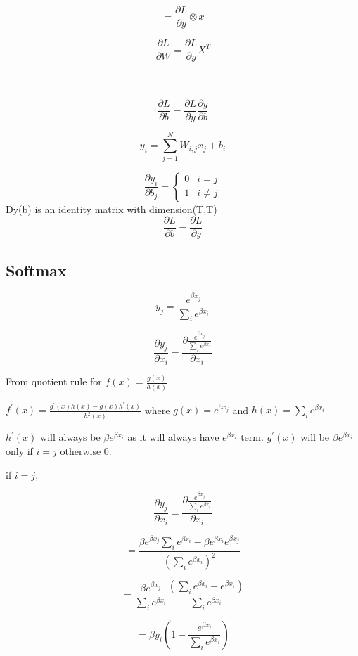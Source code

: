 \documentclass{article}
\begin{document}
\[
= \frac{\partial L}{\partial y} \otimes x
\]

\[
\frac{\partial L}{\partial W} = \frac{\partial L}{\partial y}  X^T
\]

\\
\\
\[
\frac{\partial L}{\partial b} = \frac{\partial L}{\partial y} \frac{\partial y}{\partial b}
\]

\[
y_i = \sum_{j = 1}^{N} W_{i,j} x_j + b_i 
\]

\[
\frac{\partial y_i}{\partial b_j} = \begin{cases}
  0 & i=j\\    
  1 & i \neq j    
\end{cases} 
\]
Dy(b) is an identity matrix with dimension(T,T)
\[
\frac{\partial L}{\partial b} = \frac{\partial L}{\partial y}
\]



\subsection{Softmax}

\[
y_j = \frac{e^{\beta x_j}}{\sum_{i}e^{\beta x_i}}
\]

\[
\frac{\partial y_j}{\partial x_i} = \frac {\partial \frac{e^{\beta x_j}}{\sum_{i}e^{\beta x_i}}} 
{\partial x_i}
\]

From quotient rule for $f(x) = \frac{g(x)}{h(x)}$ 


$f^\prime(x) =\frac{g^\prime(x) h(x) - g(x) h^\prime(x)}{h^2(x)}$ where $ g(x) = e^{\beta x_j} $ and $h(x) = \sum_{i} e^{\beta x_i}$


$h^\prime(x)$ will always be $\beta e^{\beta x_i} $ as it will always have $e^{\beta x_i}$ term. $g^\prime(x)$ will be $\beta e^{\beta x_i} $ only if $i=j$ otherwise 0.

if $i=j$,

\[
\frac{\partial y_j}{\partial x_i} = \frac {\partial \frac{e^{\beta x_j}}{\sum_{i}e^{\beta x_i}}}{\partial x_i}
\]

\[
= \frac{\beta e^{\beta x_j} \sum_i e^{\beta x_i} - \beta e^{\beta x_i} e^{\beta x_j} }{ ( \sum_i e^{\beta x_i} ) ^2}
\]

\[
= \frac{\beta e^{\beta x_j}}{\sum_i e^{\beta x_i}} \frac{(\sum_i e^{\beta x_i} - e^{\beta x_i})}{\sum_i e^{\beta x_i}}
\]

\[
= \beta y_i ( 1- \frac{e^{\beta x_i}}{\sum_i e^{\beta x_i}})
\]
\end{document}
